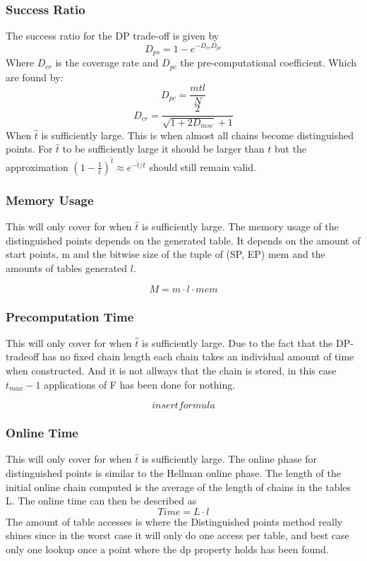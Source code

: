 \subsubsection{Success Ratio}
The success ratio for the DP trade-off is given by
\begin{equation}
  D_{ps}=1-e^{-D_{cr}D_{pc}}
\end{equation}
Where $D_{cr}$ is the coverage rate and $D_{pc}$ the pre-computational coefficient. Which are found by:
\begin{equation}
  D_{pc}=\frac{mtl}{N}
\end{equation}
\begin{equation}
  D_{cr}=\frac{2}{\sqrt{1+2D_{msc}}+1}
\end{equation}
When $\hat{t}$ is sufficiently large. This is when almost all chains become distinguished points. For $\hat{t}$ to be sufficiently large it should be larger than $t$ but the approximation $(1-\frac{1}{t})^{\hat{t}}\approx e^{-\hat{t}/t}$ should still remain valid.
\subsubsection{Memory Usage}
This will only cover for when $\hat{t}$ is sufficiently large.
The memory usage of the distinguished points depends on the generated table. It depends on the amount of start points, m and the bitwise size of the tuple of (SP, EP) mem and the amounts of tables generated $l$.

\begin{equation}
  M=m\cdot l \cdot mem
\end{equation}

\subsubsection{Precomputation Time}
This will only cover for when $\hat{t}$ is sufficiently large.
Due to the fact that the DP-tradeoff has no fixed chain length each chain takes an individual amount of time when constructed. And it is not allways that the chain is stored, in this case $t_{max}-1$ applications of F has been done for nothing.

\begin{equation}
  insert formula
\end{equation}

\subsubsection{Online Time}
This will only cover for when $\hat{t}$ is sufficiently large.
The online phase for distinguished points is similar to the Hellman
online phase. The length of the initial online chain computed is the
average of the length of chains in the tables L. The online time can
then be described as
\begin{equation}
  Time=L\cdot l
\end{equation}
The amount of table accesses is where the Distinguished points method really shines since in the worst case it will only do one access per table, and best case only one lookup once a point where the dp property holds has been found.

